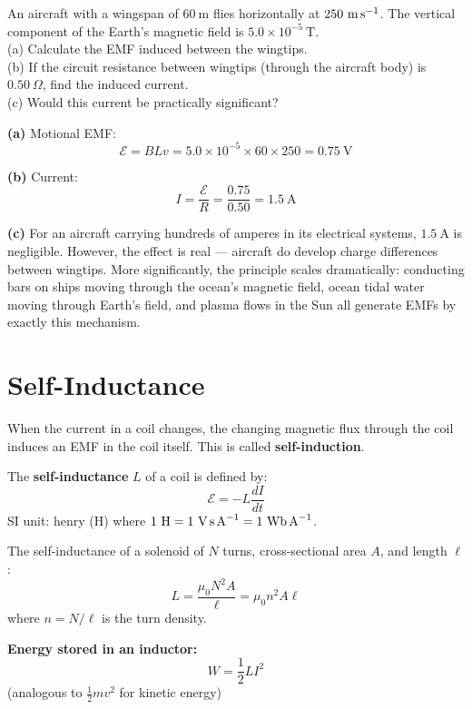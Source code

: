 \begin{examplebox}[26.2]
An aircraft with a wingspan of $60\ \text{m}$ flies
horizontally at $250\ \text{m\,s}^{-1}$. The vertical
component of the Earth's magnetic field is
$5.0\times10^{-5}\ \text{T}$.\\
(a) Calculate the EMF induced between the wingtips.\\
(b) If the circuit resistance between wingtips (through
the aircraft body) is $0.50\ \Omega$, find the
induced current.\\
(c) Would this current be practically significant?
\end{examplebox}

\begin{solutionbox}
\textbf{(a)} Motional EMF:
\[
  \mathcal{E} = BLv = 5.0\times10^{-5}
  \times 60 \times 250
  = 0.75\ \text{V}
\]

\textbf{(b)} Current:
\[
  I = \frac{\mathcal{E}}{R} = \frac{0.75}{0.50}
  = 1.5\ \text{A}
\]

\textbf{(c)} For an aircraft carrying hundreds of
amperes in its electrical systems, $1.5\ \text{A}$
is negligible. However, the effect is real ---
aircraft do develop charge differences between
wingtips. More significantly, the principle scales
dramatically: conducting bars on ships moving
through the ocean's magnetic field, ocean tidal
water moving through Earth's field, and plasma
flows in the Sun all generate EMFs by exactly
this mechanism.
\end{solutionbox}

\section{Self-Inductance}

\begin{definitionbox}
When the current in a coil changes, the changing
magnetic flux through the coil induces an EMF in the
coil itself. This is called \textbf{self-induction}.

The \textbf{self-inductance} $L$ of a coil is defined by:
\[
  \mathcal{E} = -L\frac{dI}{dt}
\]
SI unit: henry (H) where
$1\ \text{H} = 1\ \text{V\,s\,A}^{-1}
= 1\ \text{Wb\,A}^{-1}$.

The self-inductance of a solenoid of $N$ turns,
cross-sectional area $A$, and length $\ell$:
\[
  L = \frac{\mu_0 N^2 A}{\ell} = \mu_0 n^2 A\ell
\]
where $n = N/\ell$ is the turn density.

\textbf{Energy stored in an inductor:}
\[
  W = \frac{1}{2}LI^2
\]
(analogous to $\frac{1}{2}mv^2$ for kinetic energy)
\end{definitionbox}

